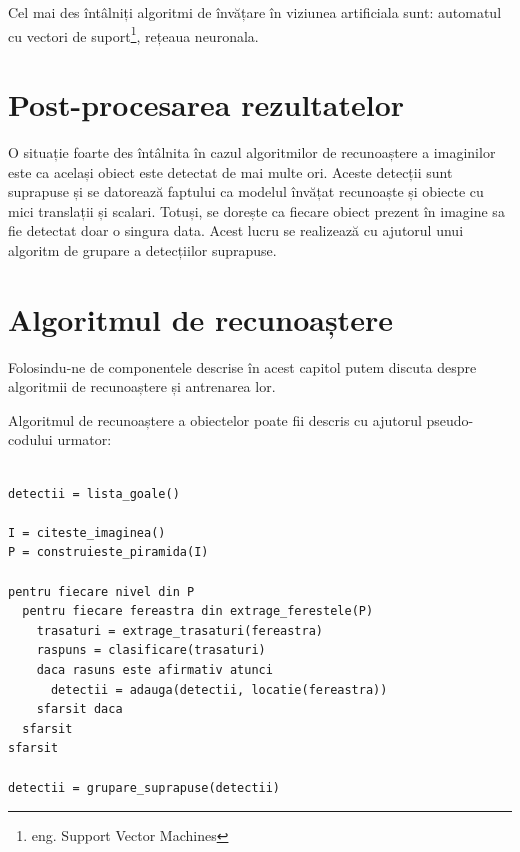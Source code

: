 Cel mai des întâlniți algoritmi de învățare în viziunea artificiala sunt: automatul cu vectori de suport\footnote{eng. Support Vector Machines}, rețeaua neuronala.

\pagebreak
\section{Post-procesarea rezultatelor}

O situație foarte des întâlnita în cazul algoritmilor de recunoaștere a imaginilor este ca același obiect este detectat de mai multe ori.
Aceste detecții sunt suprapuse și se datorează faptului ca modelul învățat recunoaște și obiecte cu mici translații și scalari.
Totuși, se dorește ca fiecare obiect prezent în imagine sa fie detectat doar o singura data.
Acest lucru se realizează cu ajutorul unui algoritm de grupare a detecțiilor suprapuse.

\pagebreak
\section{Algoritmul de recunoaștere}

Folosindu-ne de componentele descrise în acest capitol putem discuta despre algoritmii de recunoaștere și antrenarea lor.

Algoritmul de recunoaștere a obiectelor poate fii descris cu ajutorul pseudo-codului urmator:
\begin{mdframed}
\begin{verbatim}

detectii = lista_goale()

I = citeste_imaginea()
P = construieste_piramida(I)

pentru fiecare nivel din P
  pentru fiecare fereastra din extrage_ferestele(P)
    trasaturi = extrage_trasaturi(fereastra)
    raspuns = clasificare(trasaturi)
    daca rasuns este afirmativ atunci
      detectii = adauga(detectii, locatie(fereastra))
    sfarsit daca
  sfarsit
sfarsit

detectii = grupare_suprapuse(detectii)

\end{verbatim}
\end{mdframed}

